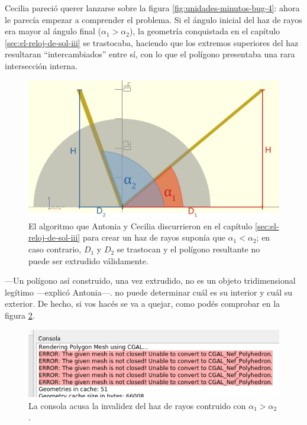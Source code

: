 Cecilia pareció querer lanzarse sobre la figura
\ref{fig:unidades-minutos-bug-4}: ahora le parecía empezar a
comprender el problema. Si el ángulo inicial del haz de rayos era
mayor al ángulo final ($\alpha_1>\alpha_2$), la geometría conquistada
en el capítulo \ref{sec:el-reloj-de-sol-iii} se trastocaba, haciendo
que los extremos superiores del haz resultaran ``intercambiados''
entre sí, con lo que el polígono presentaba una rara intersección
interna.

\begin{figure}[ht]
  \centering
  \includegraphics[width=.6\textwidth]{imagenes/dos-rayos-anotados}
  \caption{El algoritmo que Antonia y Cecilia discurrieron en el
    capítulo \ref{sec:el-reloj-de-sol-iii} para crear un haz de rayos
    suponía que $\alpha_1 < \alpha_2$; en caso contrario, $D_1$ y $D_2$
    se trastocan y el polígono resultante no puede ser extrudido
    válidamente.}
  \label{fig:alfas-cap-28}
\end{figure}

---Un polígono así construido, una vez extrudido, no es un objeto
tridimensional legítimo ---explicó Antonia---.  \openscad{} no puede
determinar cuál es su interior y cuál su exterior. De hecho, si vos
hacés  se va a quejar, como podés comprobar en la figura
\ref{fig:unidades-minutos-bug-5}.


\begin{figure}[ht]
  \centering
  \includegraphics[width=.99\textwidth]{imagenes/unidades-minutos-bug-5}
  \caption{La consola acusa la invalidez del haz de rayos contruido
    con $\alpha_1>\alpha_2$.}
  \label{fig:unidades-minutos-bug-5}
\end{figure}

